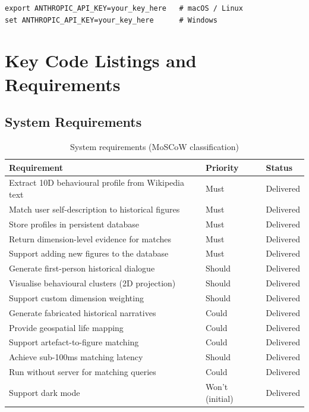 \documentclass[11pt, a4paper]{report}
\begin{document}
\begin{lstlisting}
export ANTHROPIC_API_KEY=your_key_here   # macOS / Linux
set ANTHROPIC_API_KEY=your_key_here      # Windows
\end{lstlisting}

\chapter{Key Code Listings and Requirements}
\label{app:code}

\section{System Requirements}
\label{app:requirements}

\begin{table}[H]
  \centering
  \caption{System requirements (MoSCoW classification)}
  \label{tab:requirements}
  \begin{tabular}{p{7cm}lp{2.5cm}}
    \toprule
    Requirement & Priority & Status \\
    \midrule
    Extract 10D behavioural profile from Wikipedia text & Must & Delivered \\
    Match user self-description to historical figures & Must & Delivered \\
    Store profiles in persistent database & Must & Delivered \\
    Return dimension-level evidence for matches & Must & Delivered \\
    Support adding new figures to the database & Must & Delivered \\
    Generate first-person historical dialogue & Should & Delivered \\
    Visualise behavioural clusters (2D projection) & Should & Delivered \\
    Support custom dimension weighting & Should & Delivered \\
    Generate fabricated historical narratives & Could & Delivered \\
    Provide geospatial life mapping & Could & Delivered \\
    Support artefact-to-figure matching & Could & Delivered \\
    Achieve sub-100ms matching latency & Should & Delivered \\
    Run without server for matching queries & Could & Delivered \\
    Support dark mode & Won't (initial) & Delivered \\
    \bottomrule
  \end{tabular}
\end{table}
\end{document}
